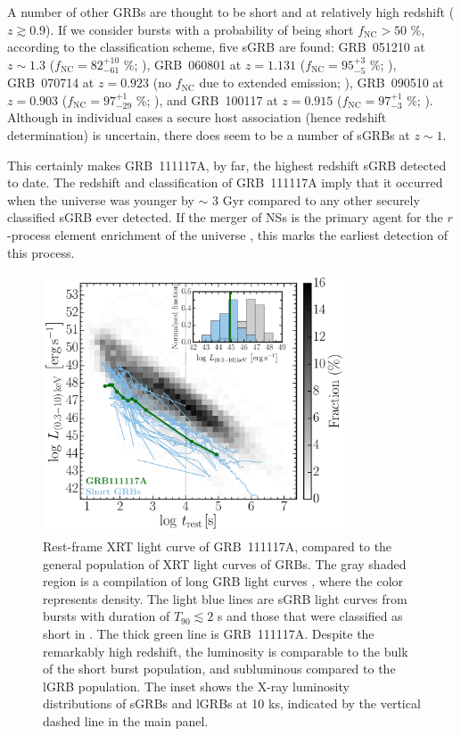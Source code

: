 \documentclass[longauth]{aa}    %
\begin{document}
A number of other GRBs are thought to be short and at relatively high redshift ($z \gtrsim 0.9$).
If we consider bursts with a probability of being short $f_{\mathrm{NC}} > 50$ \%, according to the
\citet{Bromberg2013} classification scheme, five sGRB are found:
GRB~051210 at $z \sim 1.3$ ($f_{\mathrm{NC}} = 82_{-61}^{+10}$ \%;
\citealt{Leibler2010}),
GRB~060801 at $z = 1.131$ ($f_{\mathrm{NC}} = 95_{-5}^{+3}$ \%;
\citealt{Berger2007}),
GRB~070714 at $z = 0.923$ (no $f_{\mathrm{NC}}$ due to extended emission;
\citealt{Graham2009}),
GRB~090510 at $z = 0.903$ ($f_{\mathrm{NC}} = 97_{-29}^{+1}$ \%;
\citealt{McBreen2010}), and
GRB~100117 at $z = 0.915$ ($f_{\mathrm{NC}} = 97_{-3}^{+1}$ \%;
\citealt{Fong2011}). Although in individual cases a secure host association
(hence redshift determination) is uncertain, there does seem to be a number of sGRBs at $z
\sim 1$.

This certainly makes GRB~111117A, by far, the highest redshift sGRB detected to
date. The redshift and classification of GRB~111117A imply that it occurred when
the universe was younger by $\sim$ 3 Gyr compared to any other securely
classified sGRB ever detected. If the merger of NSs is the primary agent for the
$r$-process element enrichment of the universe \citep{Goriely2011, Ji2016,
        Komiya2016, Safarzadeh2017}, this marks the earliest detection of this process.

\begin{figure}
        \centering
      \includegraphics[width=9cm]{figures/XLC_111117A_rest.pdf}
        \caption{Rest-frame XRT light curve of GRB~111117A, compared to the general population of XRT light curves of GRBs. The gray shaded region is a compilation of long GRB light curves \citep{Evans2007, Evans2009}, where the color represents density. The light blue lines are sGRB light curves from bursts with duration of $T_{90} \lesssim 2$ s and those that were classified as short in \citet{Kann2011, Berger2014, DAvanzo2014a}. The thick green line is GRB~111117A. Despite the remarkably high redshift, the luminosity is comparable to the bulk of the short burst population, and subluminous compared to the lGRB population. The inset shows the X-ray luminosity distributions of sGRBs and lGRBs at 10 ks, indicated by the vertical dashed line in the main panel.}
        \label{fig:sxray_lightcurve}
\end{figure}
\end{document}
